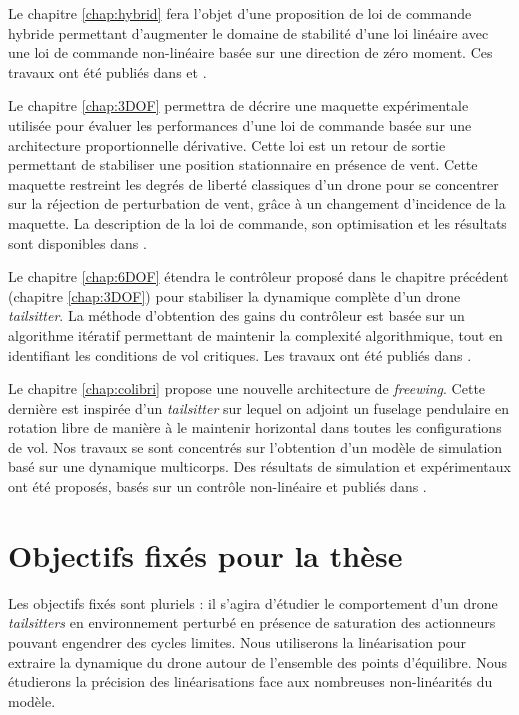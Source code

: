 Le chapitre \ref{chap:hybrid} fera l'objet d'une proposition de loi de commande hybride permettant d'augmenter le domaine de stabilité d'une loi linéaire avec une loi de commande non-linéaire basée sur une direction de zéro moment. Ces travaux ont été publiés dans  \cite{sansouStage} et \cite{sansouECC}.

Le chapitre \ref{chap:3DOF} permettra de décrire une maquette expérimentale utilisée pour évaluer les performances d'une loi de commande basée sur une architecture proportionnelle dérivative. Cette loi est un retour de sortie permettant de stabiliser une position stationnaire en présence de vent. Cette maquette restreint les degrés de liberté classiques d'un drone pour se concentrer sur la réjection de perturbation de vent, grâce à un changement d'incidence de la maquette. La description de la loi de commande, son optimisation et les résultats sont disponibles dans \cite{SANSOUACA}.

Le chapitre \ref{chap:6DOF} étendra le contrôleur proposé dans le chapitre précédent (chapitre \ref{chap:3DOF}) pour stabiliser la dynamique complète d'un drone \textit{tailsitter}. La méthode d'obtention des gains du contrôleur est basée sur un algorithme itératif permettant de maintenir la complexité algorithmique, tout en identifiant les conditions de vol critiques. Les travaux ont été publiés dans \cite{sansouTCST}.

Le chapitre \ref{chap:colibri} propose une nouvelle architecture de \textit{freewing}. Cette dernière est inspirée d'un \textit{tailsitter} sur lequel on adjoint un fuselage pendulaire en rotation libre de manière à le maintenir horizontal dans toutes les configurations de vol. Nos travaux se sont concentrés sur l'obtention d'un modèle de simulation basé sur une dynamique multicorps. Des résultats de simulation et expérimentaux ont été proposés, basés sur un contrôle non-linéaire et publiés dans \cite{sansouICUAS}.


\section*{Objectifs fixés pour la thèse}

Les objectifs fixés sont pluriels : il s'agira d'étudier le comportement d'un drone \textit{tailsitters} en environnement perturbé en présence de saturation des actionneurs pouvant engendrer des cycles limites. Nous utiliserons la linéarisation pour extraire la dynamique du drone autour de l'ensemble des points d'équilibre. Nous étudierons la précision des linéarisations face aux nombreuses non-linéarités du modèle. 

